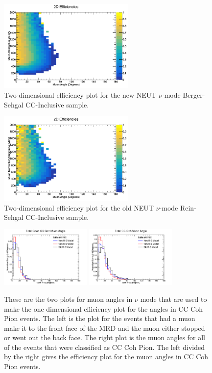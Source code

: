 \documentclass[11pt]{article}
\begin{document}
\begin{figure}[H]
\centering
\includegraphics[width=0.6\textwidth]{CCInclusivePlots/2DEffCompareNMBS.png}
\caption{Two-dimensional efficiency plot for the new NEUT $\nu$-mode Berger-Sehgal CC-Inclusive sample.}
\end{figure}

\begin{figure}[H]
\centering
\includegraphics[width=0.6\textwidth]{CCInclusivePlots/2DEffCompareNMORS.png}
\caption{Two-dimensional efficiency plot for the old NEUT $\nu$-mode Rein-Sehgal CC-Inclusive sample.}
\end{figure}

\begin{figure}[H]
\centering
\includegraphics[width=0.4\textwidth]{NMCombinedPlotsImages/14-NMCombinedPlots.png}
\includegraphics[width=0.4\textwidth]{NMCombinedPlotsImages/16-NMCombinedPlots.png}
\caption{These are the two plots for muon angles in $\nu$ mode that are used to make the one dimensional efficiency plot for the angles in CC Coh Pion events. The left is the plot for the events that had a muon make it to the front face of the MRD and the muon either stopped or went out the back face. The right plot is the muon angles for all of the events that were classified as CC Coh Pion. The left divided by the right gives the efficiency plot for the muon angles in CC Coh Pion events.}
\end{figure}
\end{document}
